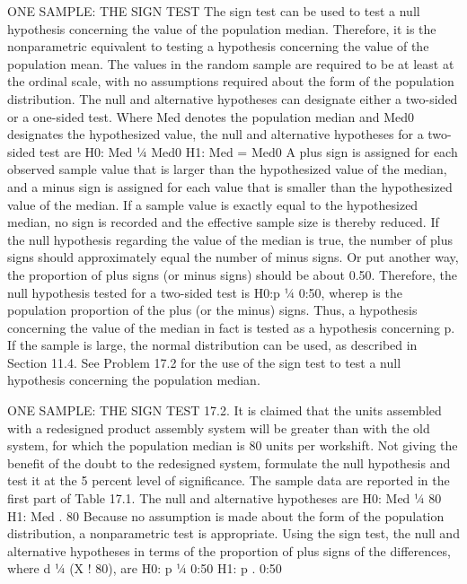 ONE SAMPLE: THE SIGN TEST
The sign test can be used to test a null hypothesis concerning the value of the population median. Therefore,
it is the nonparametric equivalent to testing a hypothesis concerning the value of the population mean. The
values in the random sample are required to be at least at the ordinal scale, with no assumptions required about
the form of the population distribution.
The null and alternative hypotheses can designate either a two-sided or a one-sided test. Where Med
denotes the population median and Med0 designates the hypothesized value, the null and alternative hypotheses
for a two-sided test are
H0: Med ¼ Med0
H1: Med = Med0
A plus sign is assigned for each observed sample value that is larger than the hypothesized value of the
median, and a minus sign is assigned for each value that is smaller than the hypothesized value of the median. If
a sample value is exactly equal to the hypothesized median, no sign is recorded and the effective sample size is
thereby reduced. If the null hypothesis regarding the value of the median is true, the number of plus signs should
approximately equal the number of minus signs. 
Or put another way, the proportion of plus signs (or minus
signs) should be about 0.50. Therefore, the null hypothesis tested for a two-sided test is H0:p ¼ 0:50, wherep is
the population proportion of the plus (or the minus) signs. Thus, a hypothesis concerning the value of the
median in fact is tested as a hypothesis concerning p. If the sample is large, the normal distribution can be used,
as described in Section 11.4.
See Problem 17.2 for the use of the sign test to test a null hypothesis concerning the population median.


ONE SAMPLE: THE SIGN TEST
17.2. It is claimed that the units assembled with a redesigned product assembly system will be greater than
with the old system, for which the population median is 80 units per workshift. Not giving the benefit of
the doubt to the redesigned system, formulate the null hypothesis and test it at the 5 percent level of
significance. The sample data are reported in the first part of Table 17.1.
The null and alternative hypotheses are
H0: Med ¼ 80
H1: Med . 80
Because no assumption is made about the form of the population distribution, a nonparametric test is
appropriate. Using the sign test, the null and alternative hypotheses in terms of the proportion of plus signs of the
differences, where d ¼ (X ! 80), are
H0: p ¼ 0:50
H1: p . 0:50
